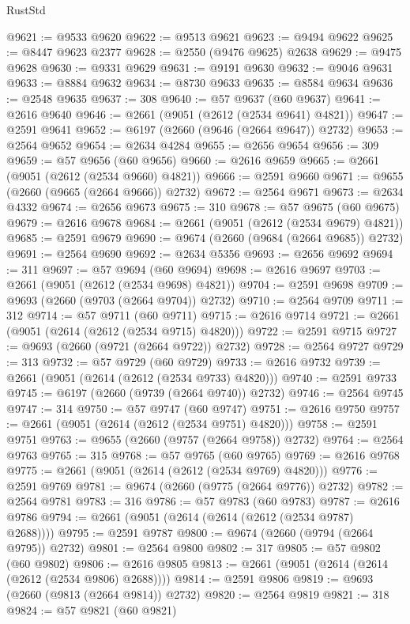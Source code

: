 \begin{lexlean}{RustStd}
\begin{coremodule}
@9621 := @9533 @9620
@9622 := @9513 @9621
@9623 := @9494 @9622
@9625 := @8447 @9623 @2377
@9628 := @2550 (@9476 @9625) @2638
@9629 := @9475 @9628
@9630 := @9331 @9629
@9631 := @9191 @9630
@9632 := @9046 @9631
@9633 := @8884 @9632
@9634 := @8730 @9633
@9635 := @8584 @9634
@9636 := @2548 @9635
@9637 := 308
@9640 := @57 @9637 (@60 @9637)
@9641 := @2616 @9640
@9646 := @2661 (@9051 (@2612 (@2534 @9641) @4821))
@9647 := @2591 @9641
@9652 := @6197 (@2660 (@9646 (@2664 @9647)) @2732)
@9653 := @2564 @9652
@9654 := @2634 @4284
@9655 := @2656 @9654
@9656 := 309
@9659 := @57 @9656 (@60 @9656)
@9660 := @2616 @9659
@9665 := @2661 (@9051 (@2612 (@2534 @9660) @4821))
@9666 := @2591 @9660
@9671 := @9655 (@2660 (@9665 (@2664 @9666)) @2732)
@9672 := @2564 @9671
@9673 := @2634 @4332
@9674 := @2656 @9673
@9675 := 310
@9678 := @57 @9675 (@60 @9675)
@9679 := @2616 @9678
@9684 := @2661 (@9051 (@2612 (@2534 @9679) @4821))
@9685 := @2591 @9679
@9690 := @9674 (@2660 (@9684 (@2664 @9685)) @2732)
@9691 := @2564 @9690
@9692 := @2634 @5356
@9693 := @2656 @9692
@9694 := 311
@9697 := @57 @9694 (@60 @9694)
@9698 := @2616 @9697
@9703 := @2661 (@9051 (@2612 (@2534 @9698) @4821))
@9704 := @2591 @9698
@9709 := @9693 (@2660 (@9703 (@2664 @9704)) @2732)
@9710 := @2564 @9709
@9711 := 312
@9714 := @57 @9711 (@60 @9711)
@9715 := @2616 @9714
@9721 := @2661 (@9051 (@2614 (@2612 (@2534 @9715) @4820)))
@9722 := @2591 @9715
@9727 := @9693 (@2660 (@9721 (@2664 @9722)) @2732)
@9728 := @2564 @9727
@9729 := 313
@9732 := @57 @9729 (@60 @9729)
@9733 := @2616 @9732
@9739 := @2661 (@9051 (@2614 (@2612 (@2534 @9733) @4820)))
@9740 := @2591 @9733
@9745 := @6197 (@2660 (@9739 (@2664 @9740)) @2732)
@9746 := @2564 @9745
@9747 := 314
@9750 := @57 @9747 (@60 @9747)
@9751 := @2616 @9750
@9757 := @2661 (@9051 (@2614 (@2612 (@2534 @9751) @4820)))
@9758 := @2591 @9751
@9763 := @9655 (@2660 (@9757 (@2664 @9758)) @2732)
@9764 := @2564 @9763
@9765 := 315
@9768 := @57 @9765 (@60 @9765)
@9769 := @2616 @9768
@9775 := @2661 (@9051 (@2614 (@2612 (@2534 @9769) @4820)))
@9776 := @2591 @9769
@9781 := @9674 (@2660 (@9775 (@2664 @9776)) @2732)
@9782 := @2564 @9781
@9783 := 316
@9786 := @57 @9783 (@60 @9783)
@9787 := @2616 @9786
@9794 := @2661 (@9051 (@2614 (@2614 (@2612 (@2534 @9787) @2688))))
@9795 := @2591 @9787
@9800 := @9674 (@2660 (@9794 (@2664 @9795)) @2732)
@9801 := @2564 @9800
@9802 := 317
@9805 := @57 @9802 (@60 @9802)
@9806 := @2616 @9805
@9813 := @2661 (@9051 (@2614 (@2614 (@2612 (@2534 @9806) @2688))))
@9814 := @2591 @9806
@9819 := @9693 (@2660 (@9813 (@2664 @9814)) @2732)
@9820 := @2564 @9819
@9821 := 318
@9824 := @57 @9821 (@60 @9821)

\end{coremodule}
\end{lexlean}
